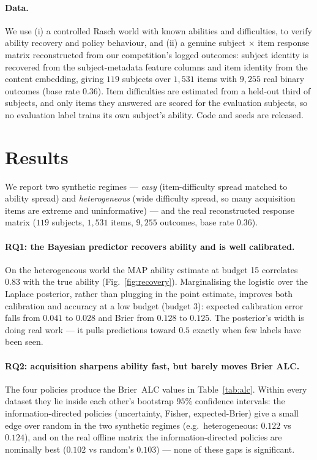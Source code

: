 \documentclass{article}
\begin{document}
\paragraph{Data.} We use (i) a controlled Rasch world with known abilities and
difficulties, to verify ability recovery and policy behaviour, and (ii) a genuine
subject $\times$ item response matrix reconstructed from our competition's logged
outcomes: subject identity is recovered from the subject-metadata feature columns
and item identity from the content embedding, giving $119$ subjects over
$1{,}531$ items with $9{,}255$ real binary outcomes (base rate $0.36$). Item
difficulties are estimated from a held-out third of subjects, and only items they
answered are scored for the evaluation subjects, so no evaluation label trains
its own subject's ability. Code and seeds are released.

\section{Results}

We report two synthetic regimes --- \emph{easy} (item-difficulty spread matched
to ability spread) and \emph{heterogeneous} (wide difficulty spread, so many
acquisition items are extreme and uninformative) --- and the real reconstructed
response matrix ($119$ subjects, $1{,}531$ items, $9{,}255$ outcomes, base rate
$0.36$).

\paragraph{RQ1: the Bayesian predictor recovers ability and is well calibrated.}
On the heterogeneous world the MAP ability estimate at budget 15 correlates
$0.83$ with the true ability (Fig.~\ref{fig:recovery}). Marginalising the
logistic over the Laplace posterior, rather than plugging in the point estimate,
improves both calibration and accuracy at a low budget (budget 3): expected
calibration error falls from $0.041$ to $\mathbf{0.028}$ and Brier from $0.128$
to $\mathbf{0.125}$. The posterior's width is doing real work --- it pulls
predictions toward $0.5$ exactly when few labels have been seen.

\paragraph{RQ2: acquisition sharpens ability fast, but barely moves Brier ALC.}
The four policies produce the Brier~ALC values in Table~\ref{tab:alc}. Within
every dataset they lie inside each other's bootstrap $95\%$ confidence
intervals: the information-directed policies (uncertainty, Fisher,
expected-Brier) give a small edge over random in the two synthetic regimes
(e.g.\ heterogeneous: $0.122$ vs $0.124$), and on the real offline matrix the
information-directed policies are nominally best ($0.102$ vs random's $0.103$)
--- none of these gaps is significant.
\end{document}
